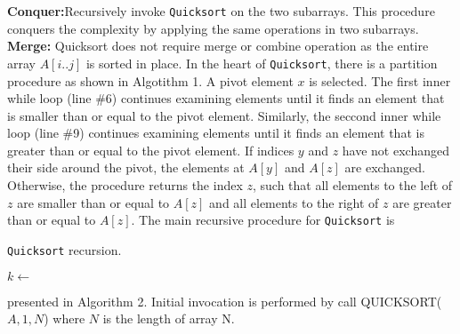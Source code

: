 \documentclass[a4paper, 10pt,twocolumn]{article} %
\begin{document}
\noindent\textbf{Conquer:}Recursively invoke \texttt{Quicksort} on the two subarrays. This procedure conquers the complexity by applying the same operations in two subarrays.\newline
\textbf{Merge:} Quicksort does not require merge or combine operation as the entire array $A[i..j]$ is sorted in place.\newline
\indent In the heart of \texttt{Quicksort}, there is a partition procedure as shown in Algotithm 1. A pivot element $x$ is selected. The first inner while loop (line \#6) continues examining elements until it finds an element that is smaller than or equal to the pivot element. Similarly, the seccond inner while loop (line \#9) continues examining elements until it finds an element that is greater than or equal to the pivot element. If indices $y$ and $z$ have not exchanged their side around the pivot, the elements at $A[y]$ and $A[z]$ are exchanged. Otherwise, the procedure returns the index $z$, such that all elements to the left of $z$ are smaller than or equal to $A[z]$ and all elements to the right of $z$ are greater than or equal to $A[z]$.\newline
The main recursive procedure for \texttt{Quicksort} is
\begin{algorithm}
\caption{\texttt{Quicksort} recursion.}
\begin{algorithmic}[1]
    \Statex{}
        \State $k \gets$   %
        \State {}
        \State {}
    \EndIf
\EndProcedure
\end{algorithmic}
\end{algorithm}

\noindent presented in Algorithm 2. Initial invocation is performed by call QUICKSORT($A,1,N$) where  $N$ is the length of array N.
\end{document}
